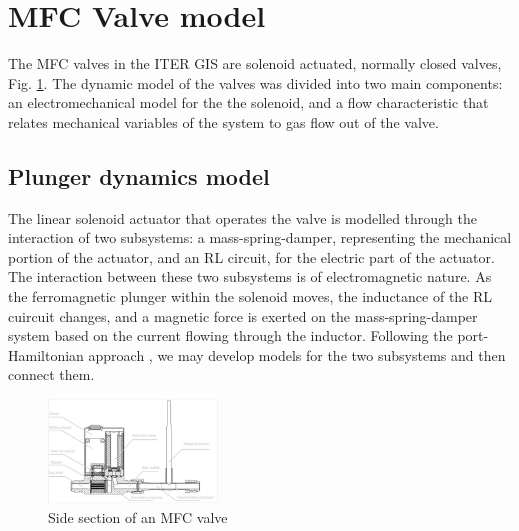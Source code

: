 \documentclass[letterpaper, 10pt, conference]{ieeeconf}
\begin{document}
\section{MFC Valve model}\label{sec:vlvmdl}
The MFC valves in the ITER GIS are solenoid actuated, normally closed valves, Fig. \ref{fig:valvesec}. 
The dynamic model of the valves was divided into two main components: an electromechanical model for the the solenoid, and a flow characteristic that relates mechanical variables of the system to gas flow out of the valve.
\subsection{Plunger dynamics model} \label{sec:plung}
The linear solenoid actuator that operates the valve is modelled through the interaction of two subsystems: a mass-spring-damper, representing the mechanical portion of the actuator, and an RL circuit, for the electric part of the actuator. 
The interaction between these two subsystems is of electromagnetic nature. As the ferromagnetic plunger within the solenoid moves, the inductance of the RL cuircuit changes, and a magnetic force is exerted on the mass-spring-damper system based on the current flowing through the inductor. Following the port-Hamiltonian approach \cite{PHintro}, we may develop models for the two subsystems and then connect them.
\begin{figure}[!ht]
    \centering
     \includegraphics[width=0.4\textwidth]{valvesection}
     \caption{Side section of an MFC valve}
     \label{fig:valvesec}
\end{figure}
\end{document}
